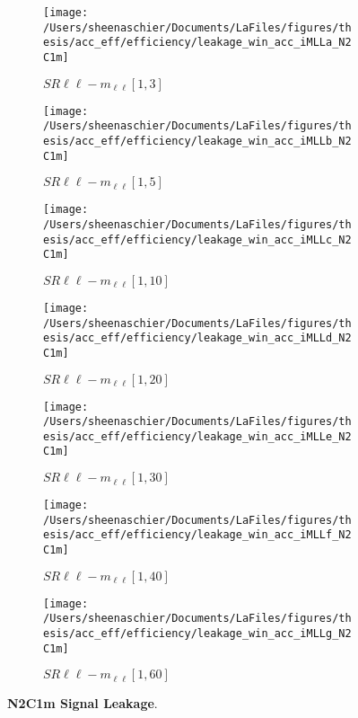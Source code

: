 \begin{figure}
        \centering
    \begin{subfigure}[b]{0.44\textwidth}
        \texttt{[image: /Users/sheenaschier/Documents/LaFiles/figures/thesis/acc\_eff/efficiency/leakage\_win\_acc\_iMLLa\_N2C1m]}
    \caption{$SR\ell\ell-m_{\ell\ell} [1, 3]$}
    \end{subfigure}
    \begin{subfigure}[b]{0.44\textwidth}
        \texttt{[image: /Users/sheenaschier/Documents/LaFiles/figures/thesis/acc\_eff/efficiency/leakage\_win\_acc\_iMLLb\_N2C1m]}
    \caption{$SR\ell\ell-m_{\ell\ell} [1, 5]$}
    \end{subfigure}
    \begin{subfigure}[b]{0.44\textwidth}
        \texttt{[image: /Users/sheenaschier/Documents/LaFiles/figures/thesis/acc\_eff/efficiency/leakage\_win\_acc\_iMLLc\_N2C1m]}
    \caption{$SR\ell\ell-m_{\ell\ell} [1, 10]$}
    \end{subfigure}
    \begin{subfigure}[b]{0.44\textwidth}
        \texttt{[image: /Users/sheenaschier/Documents/LaFiles/figures/thesis/acc\_eff/efficiency/leakage\_win\_acc\_iMLLd\_N2C1m]}
    \caption{$SR\ell\ell-m_{\ell\ell} [1, 20]$}
    \end{subfigure}
    \begin{subfigure}[b]{0.44\textwidth}
        \texttt{[image: /Users/sheenaschier/Documents/LaFiles/figures/thesis/acc\_eff/efficiency/leakage\_win\_acc\_iMLLe\_N2C1m]}
    \caption{$SR\ell\ell-m_{\ell\ell} [1, 30]$}
    \end{subfigure}
    \begin{subfigure}[b]{0.44\textwidth}
        \texttt{[image: /Users/sheenaschier/Documents/LaFiles/figures/thesis/acc\_eff/efficiency/leakage\_win\_acc\_iMLLf\_N2C1m]}
    \caption{$SR\ell\ell-m_{\ell\ell} [1, 40]$}
    \end{subfigure}
    \begin{subfigure}[b]{0.44\textwidth}
        \texttt{[image: /Users/sheenaschier/Documents/LaFiles/figures/thesis/acc\_eff/efficiency/leakage\_win\_acc\_iMLLg\_N2C1m]}
    \caption{$SR\ell\ell-m_{\ell\ell} [1, 60]$}
    \end{subfigure}
    \caption{\textbf{N2C1m Signal Leakage}.}
\end{figure}


